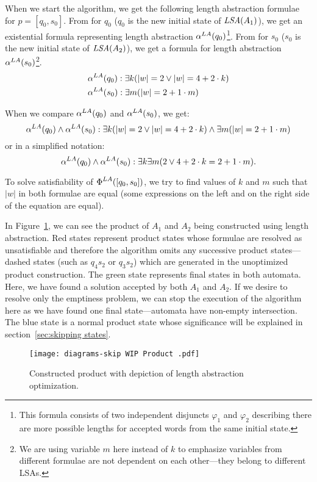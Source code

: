 When we start the algorithm, we get the following length abstraction formulae for $p = [q_0, s_0]$. From  for $q_0$ ($q_0$ is the new initial state of $\emph{LSA}(A_1)$), we get an existential formula representing length abstraction $\alpha^{LA}(q_0)$\footnote{This formula consists of two independent disjuncts $\varphi_1$ and $\varphi_2$ describing there are more possible lengths for accepted words from the same initial state.}. From  for $s_0$ ($s_0$ is the new initial state of $\emph{LSA}(A_2)$), we get a formula for length abstraction $\alpha^{LA}(s_0)$\footnote{We are using variable $m$ here instead of $k$ to emphasize variables from different formulae are not dependent on each other---they belong to different LSAs.}.
\begin{align*}
    &\alpha^{LA}(q_0): \exists k ( |w| = 2 \lor |w| = 4 + 2 \cdot k ) \\
    &\alpha^{LA}(s_0): \exists m ( |w| = 2 + 1 \cdot m )
\end{align*}

When we compare $\alpha^{LA}(q_0)$ and $\alpha^{LA}(s_0)$, we get:
\[
    \alpha^{LA}(q_0) \land \alpha^{LA}(s_0) : \exists k ( |w| = 2 \lor |w| = 4 + 2 \cdot k ) \land \exists m ( |w| = 2 + 1 \cdot m )
\]
or in a simplified notation:
$$ \alpha^{LA}(q_0) \land \alpha^{LA}(s_0) : \exists k \exists m ( 2 \lor 4 + 2 \cdot k = 2 + 1 \cdot m ) \text{.} $$

To solve satisfiability of $\emph{$\Phi$}^{LA}([q_0, s_0])$, we try to find values of $k$ and $m$ such that $|w|$ in both formulae are equal (some expressions on the left and on the right side of the equation are equal).

In Figure~\ref{fig:product_WIP}, we can see the product of $A_1$ and $A_2$ being constructed using length abstraction. Red states represent product states whose formulae are resolved as unsatisfiable and therefore the algorithm omits any successive product states---dashed states (such as $q_4s_2$ or $q_3s_2$) which are generated in the unoptimized product construction. The green state represents final states in both automata. Here, we have found a solution accepted by both $A_1$ and $A_2$. If we desire to resolve only the emptiness problem, we can stop the execution of the algorithm here as we have found one final state---automata have non-empty intersection. The blue state is a normal product state whose significance will be explained in section~\ref{sec:skipping states}.

\begin{figure}[ht]
	\centering
	\texttt{[image: diagrams-skip WIP Product .pdf]}
	\caption{Constructed product with depiction of length abstraction optimization.}
	\label{fig:product_WIP}
\end{figure}

